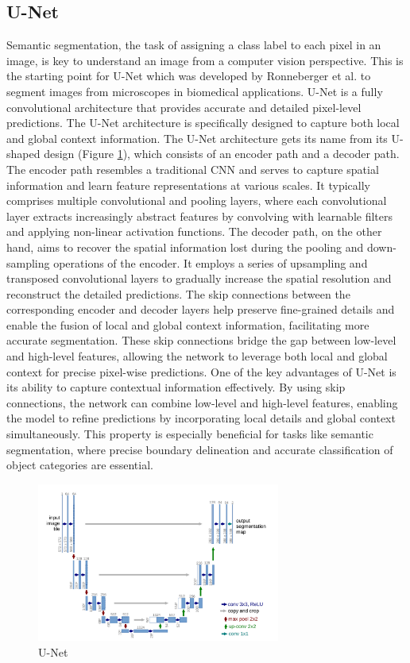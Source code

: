 \subsection{U-Net}
Semantic segmentation, the task of assigning a class label to each pixel in an image, is key to understand an image from a computer vision perspective.
This is the starting point for U-Net which was developed by Ronneberger et al. \cite{ronneberger-2015} to segment images from microscopes in biomedical applications.
U-Net is a fully convolutional architecture that provides accurate and detailed pixel-level predictions.
The U-Net architecture is specifically designed to capture both local and global context information.
The U-Net architecture gets its name from its U-shaped design (Figure \ref{fig:unet}), which consists of an encoder path and a decoder path.
The encoder path resembles a traditional CNN and serves to capture spatial information and learn feature representations at various scales.
It typically comprises multiple convolutional and pooling layers, where each convolutional layer extracts increasingly abstract features by convolving with learnable filters and applying non-linear activation functions.
The decoder path, on the other hand, aims to recover the spatial information lost during the pooling and down-sampling operations of the encoder.
It employs a series of upsampling and transposed convolutional layers to gradually increase the spatial resolution and reconstruct the detailed predictions.
The skip connections between the corresponding encoder and decoder layers help preserve fine-grained details and enable the fusion of local and global context information, facilitating more accurate segmentation.
These skip connections bridge the gap between low-level and high-level features, allowing the network to leverage both local and global context for precise pixel-wise predictions.
One of the key advantages of U-Net is its ability to capture contextual information effectively. By using skip connections, the network can combine low-level and high-level features, enabling the model to refine predictions by incorporating local details and global context simultaneously. This property is especially beneficial for tasks like semantic segmentation, where precise boundary delineation and accurate classification of object categories are essential.
\begin{figure}
  \includegraphics[width=8cm]{../images/unet.png}
  \caption[short]{U-Net}
  \label{fig:unet}
\end{figure}

